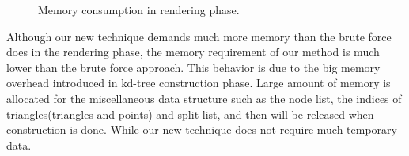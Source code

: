 \begin{figure}[ftp] 
    \centering 
    \renewcommand{\thefigure}{\thechapter.\arabic{figure}}
    \caption[Memory consumption in rendering phase]{Memory consumption in rendering phase.}
    \label{fig:memory_consumption} 
\end{figure}  

Although our new technique demands much more memory than the brute force does in the rendering phase, the memory requirement of our method is much lower than the brute force approach. This behavior is due to the big memory overhead introduced in kd-tree construction phase. Large amount of memory is allocated for the miscellaneous data structure such as the node list, the indices of triangles(triangles and points) and split list, and then will be released when construction is done. While our new technique does not require much temporary data. 

